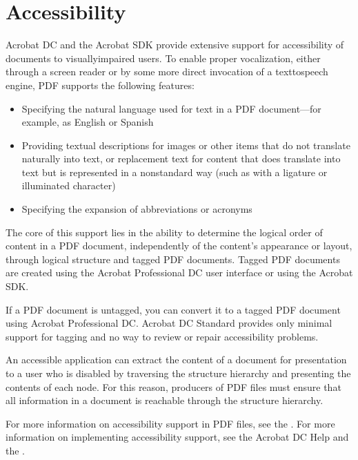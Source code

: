 \documentclass[letterpaper,12pt,english,openany,oneside]{sphinxmanual}
\begin{document}
\section{Accessibility}
\label{\detokenize{Overview_Metadata:accessibility}}
Acrobat DC and the Acrobat SDK provide extensive support for accessibility of documents to visually\sphinxhyphen{}impaired users. To enable proper vocalization, either through a screen reader or by some more direct invocation of a text\sphinxhyphen{}to\sphinxhyphen{}speech engine, PDF supports the following features:
\begin{itemize}
\item {} 
Specifying the natural language used for text in a PDF document—for example, as English or Spanish

\item {} 
Providing textual descriptions for images or other items that do not translate naturally into text, or replacement text for content that does translate into text but is represented in a nonstandard way (such as with a ligature or illuminated character)

\item {} 
Specifying the expansion of abbreviations or acronyms

\end{itemize}

The core of this support lies in the ability to determine the logical order of content in a PDF document, independently of the content’s appearance or layout, through logical structure and tagged PDF documents. Tagged PDF documents are created using the Acrobat Professional DC user interface or using the Acrobat SDK.

If a PDF document is untagged, you can convert it to a tagged PDF document using Acrobat Professional DC. Acrobat DC Standard provides only minimal support for tagging and no way to review or repair accessibility problems.

An accessible application can extract the content of a document for presentation to a user who is disabled by traversing the structure hierarchy and presenting the contents of each node. For this reason, producers of PDF files must ensure that all information in a document is reachable through the structure hierarchy.

For more information on accessibility support in PDF files, see the  . For more information on implementing accessibility support, see the Acrobat DC Help and the  .
\end{document}
